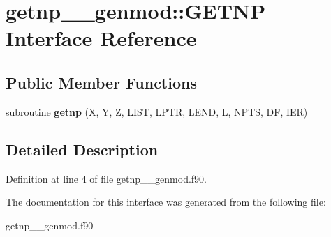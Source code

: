 \hypertarget{interfacegetnp____genmod_1_1_g_e_t_n_p}{\section{getnp\+\_\+\+\_\+genmod\+:\+:G\+E\+T\+N\+P Interface Reference}
\label{interfacegetnp____genmod_1_1_g_e_t_n_p}
}
\subsection*{Public Member Functions}
\begin{DoxyCompactItemize}
\item 
\hypertarget{interfacegetnp____genmod_1_1_g_e_t_n_p_a78095faf0d73f63ca23a69f3ba066cd3}{subroutine {\bfseries getnp} (X, Y, Z, L\+I\+S\+T, L\+P\+T\+R, L\+E\+N\+D, L, N\+P\+T\+S, D\+F, I\+E\+R)}\label{interfacegetnp____genmod_1_1_g_e_t_n_p_a78095faf0d73f63ca23a69f3ba066cd3}

\end{DoxyCompactItemize}


\subsection{Detailed Description}


Definition at line 4 of file getnp\+\_\+\+\_\+genmod.\+f90.



The documentation for this interface was generated from the following file\+:\begin{DoxyCompactItemize}
\item 
getnp\+\_\+\+\_\+genmod.\+f90\end{DoxyCompactItemize}
